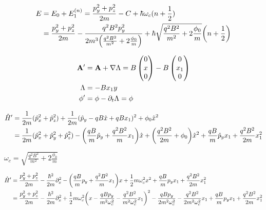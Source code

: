 \documentclass[a4paper,10pt]{article}
\begin{document}
\begin{align}
	E
	&=
	E_0
	+
	E_1^{(n)}
	=
    \frac{p_y^2+p_z^2}{2m}
	-
	C
	+
	\hbar\omega_c
	(n+\frac{1}{2})
\\
	&=
    \frac{p_y^2+p_z^2}{2m}
	-
	\frac{q^2 B^2 p_y^2}
	{
		2m^3
		\pqty{\frac{q^2 B^2}{m^2}+2\frac{\phi_0}{m}}
	}
	+
	\hbar
	\sqrt{\frac{q^2 B^2}{m^2}+2\frac{\phi_0}{m}}
	\pqty{n+\frac{1}{2}}
\end{align}


\begin{align}
	\vb{A}^\prime
	&=
	\vb{A}
	+
	\nabla\Lambda
	=
	B\pmqty{0\\x\\0}
	-
	B\pmqty{0\\x_1\\0}
\\
	\Lambda
	&=
	-Bx_1 y
\\
	\phi^\prime
	&=
	\phi
	-
	\partial_t
	\Lambda
	=
	\phi
\end{align}


\begin{align}
    \hat{H}^\prime
    &=
    \frac{1}{2m}
    (\hat{p}_x^2+\hat{p}_z^2)
    +
    \frac{1}{2m}
    (\hat{p}_y-qB\hat{x}+qBx_1)^2
    +
    \phi_0
    \hat{x}^2
\\
    &=
    \frac{1}{2m}
    (\hat{p}_x^2+\hat{p}_y^2+\hat{p}_z^2)
    -
    \pqty{
	    \frac{qB}{m}
    		\hat{p}_y
    		+
	    \frac{q^2B^2}{m}
    		x_1
    }
	\hat{x}
    +
    \pqty{
	    \frac{q^2B^2}{2m}
	    +
    		\phi_0
    	}
    \hat{x}^2
    +
    \frac{qB}{m}
    \hat{p}_y
    x_1
    +
    \frac{q^2B^2}{2m}
    x_1^2
\end{align}

$\omega_c=\sqrt{\frac{q^2 B^2}{m^2}+2\frac{\phi_0}{m}}$

\begin{align}
	\hat{H}^\prime  
    &=
    \frac{p_y^2+p_z^2}{2m}
	-
    \frac{\hbar^2}{2m}    
    \partial_x^2
    -
    \pqty{
	    \frac{qB}{m}
    		p_y
    		+
	    \frac{q^2B^2}{m}
    		x_1
    }
    x
    +
    \frac{1}{2}
    m\omega_c^2
    x^2
    +
    \frac{qB}{m}
    p_y
    x_1
    +
    \frac{q^2B^2}{2m}
    x_1^2
\\
	&=
    \frac{p_y^2+p_z^2}{2m}
	-
    \frac{\hbar^2}{2m}    
    \partial_x^2
	+
    \frac{1}{2}
    m\omega_c^2
	\pqty{
		x
		-
		\frac{qBp_y}{m^2\omega_c^2}
		-
		\frac{q^2 B^2}{m^2\omega_c^2}
		x_1
	}^2
	-
	\frac{qBp_y}{2m^2\omega_c^2}
	-
	\frac{q^2 B^2}{2m^2\omega_c^2}x_1
    +
    \frac{qB}{m}
    p_y
    x_1
    +
    \frac{q^2B^2}{2m}
    x_1^2
\end{align}
\end{document}
